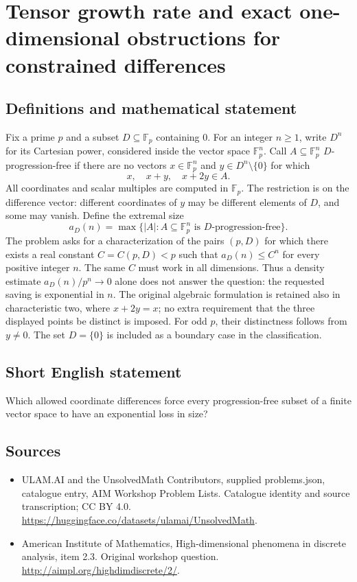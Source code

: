 \documentclass[11pt,a4paper]{article}
\begin{document}
\section*{Tensor growth rate and exact one-dimensional obstructions for constrained differences}\label{statement}

\subsection{Definitions and mathematical statement}
Fix a prime $p$ and a subset $D\subseteq\mathbb F_p$ containing $0$.
For an integer $n\ge1$, write $D^n$ for its Cartesian power, considered
inside the vector space $\mathbb F_p^n$. Call $A\subseteq\mathbb F_p^n$
$D$-progression-free if there are no vectors $x\in\mathbb F_p^n$ and
$y\in D^n\setminus\{0\}$ for which
\[
                 x,\quad x+y,\quad x+2y\in A.
\]
All coordinates and scalar multiples are computed in $\mathbb F_p$.
The restriction is on the difference vector: different coordinates of
$y$ may be different elements of $D$, and some may vanish.
Define the extremal size
\[
 a_D(n)=\max\{|A|:A\subseteq\mathbb F_p^n\text{ is }D\text{-progression-free}\}.
\]
The problem asks for a characterization of the pairs $(p,D)$ for which
there exists a real constant $C=C(p,D)<p$ such that
$a_D(n)\le C^n$ for every positive integer $n$. The same $C$ must work
in all dimensions. Thus a density estimate $a_D(n)/p^n\to0$ alone
does not answer the question: the requested saving is exponential in $n$.
The original algebraic formulation is retained also in characteristic two,
where $x+2y=x$; no extra requirement that the three displayed points be
distinct is imposed. For odd $p$, their distinctness follows from $y\ne0$.
The set $D=\{0\}$ is included as a boundary case in the classification.
\subsection{Short English statement}
Which allowed coordinate differences force every progression-free subset of a finite vector space to have an exponential loss in size?
\subsection{Sources}
\begin{itemize}
\item[S1] ULAM.AI and the UnsolvedMath Contributors, supplied problems.json, catalogue entry, AIM Workshop Problem Lists. Catalogue identity and source transcription; CC BY 4.0.
\url{https://huggingface.co/datasets/ulamai/UnsolvedMath}.
\item[S2] American Institute of Mathematics, High-dimensional phenomena in discrete analysis, item 2.3. Original workshop question.
\url{http://aimpl.org/highdimdiscrete/2/}.
\end{itemize}
\end{document}
